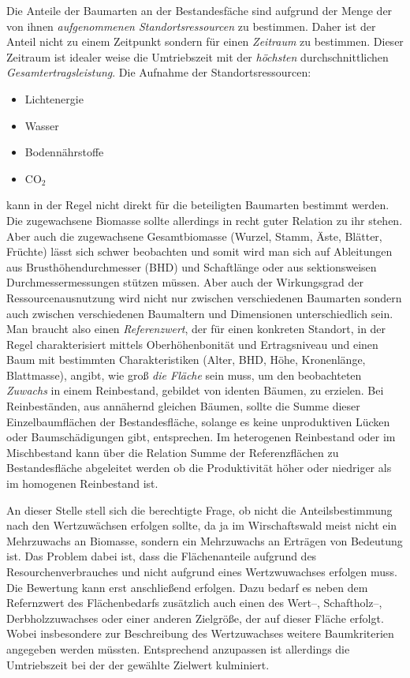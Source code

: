 \documentclass[twocolumn]{scrartcl}
\begin{document}
Die Anteile der Baumarten an der Bestandesfäche sind aufgrund der
Menge der von ihnen \emph{aufgenommenen Standortsressourcen} zu
bestimmen. Daher ist der Anteil nicht zu einem Zeitpunkt sondern für
einen \emph{Zeitraum} zu bestimmen. Dieser Zeitraum ist idealer weise
die Umtriebszeit mit der \emph{höchsten} durchschnittlichen
\emph{Gesamtertragsleistung}. Die Aufnahme der Standortsressourcen:
\begin{itemize}
\item Lichtenergie
\item Wasser
\item Bodennährstoffe
\item CO$_2$
\end{itemize}
kann in der Regel nicht direkt für die beteiligten Baumarten bestimmt
werden. Die zugewachsene Biomasse sollte allerdings in recht guter
Relation zu ihr stehen. Aber auch die zugewachsene Gesamtbiomasse
(Wurzel, Stamm, Äste, Blätter, Früchte) lässt sich schwer beobachten
und somit wird man sich auf Ableitungen aus Brusthöhendurchmesser
(BHD) und Schaftlänge oder aus sektionsweisen Durchmessermessungen
stützen müssen. Aber auch der Wirkungsgrad der Ressourcenausnutzung
wird nicht nur zwischen verschiedenen Baumarten sondern auch zwischen
verschiedenen Baumaltern und Dimensionen unterschiedlich sein. Man
braucht also einen \emph{Referenzwert}, der für einen konkreten
Standort, in der Regel charakterisiert mittels Oberhöhenbonität und
Ertragsniveau und einen Baum mit bestimmten Charakteristiken (Alter,
BHD, Höhe, Kronenlänge, Blattmasse), angibt, wie groß \emph{die
Fläche} sein muss, um den beobachteten \emph{Zuwachs} in einem
Reinbestand, gebildet von identen Bäumen, zu erzielen. Bei
Reinbeständen, aus annähernd gleichen Bäumen, sollte die Summe dieser
Einzelbaumflächen der Bestandesfläche, solange es keine unproduktiven
Lücken oder Baumschädigungen gibt, entsprechen. Im heterogenen
Reinbestand oder im Mischbestand kann über die Relation Summe der
Referenzflächen zu Bestandesfläche abgeleitet werden ob die
Produktivität höher oder niedriger als im homogenen Reinbestand ist.

An dieser Stelle stell sich die berechtigte Frage, ob nicht die
Anteilsbestimmung nach den Wertzuwächsen erfolgen sollte, da ja im
Wirschaftswald meist nicht ein Mehrzuwachs an Biomasse, sondern ein
Mehrzuwachs an Erträgen von Bedeutung ist. Das Problem dabei ist, dass
die Flächenanteile aufgrund des Resourchenverbrauches und nicht
aufgrund eines Wertzwuwachses erfolgen muss. Die Bewertung kann erst
anschließend erfolgen. Dazu bedarf es neben dem Refernzwert des
Flächenbedarfs zusätzlich auch einen des Wert--, Schaftholz--,
Derbholzzuwachses oder einer anderen Zielgröße, der auf dieser Fläche
erfolgt. Wobei insbesondere zur Beschreibung des Wertzuwachses weitere
Baumkriterien angegeben werden müssten. Entsprechend anzupassen ist
allerdings die Umtriebszeit bei der der gewählte Zielwert kulminiert.
\end{document}

